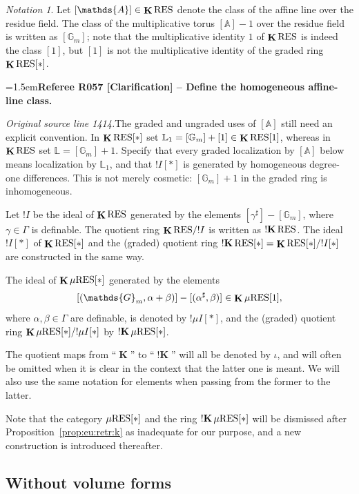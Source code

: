 \documentclass[12pt]{amsart}
\newcommand{\RefereeRemark}[4]{%
  \par\medskip\begingroup\normalfont\small\color{RefereePurple}%
  \emergencystretch=1.5em\noindent\textbf{Referee R#1 [#2] -- #3.}\par\nobreak\noindent #4\par
  \endgroup\medskip
}
\theoremstyle{plain}
\theoremstyle{definition}
\theoremstyle{remark}
\newtheorem{nota}[thm]{Notation}
\numberwithin{equation}{section}
\theoremstyle{plain}
\newcommand{\A}{\mathds{A}}
\newcommand{\G}{\mathds{G}}
\newcommand{\0}{\emptyset}
\newcommand{\RES}{\textup{RES}}
\newcommand{\mgRES}{{\mu}{\RES}}
\DeclareMathOperator{\ggk}{\mathbf{K}}
\DeclareMathOperator{\sggk}{!\mathbf{K}}
\begin{document}
\begin{nota}\label{res:note}
Let $[\A] \in \ggk \RES$ denote the class of the affine line over the residue field. The class of the multiplicative torus $[\A] - 1$ over the residue field is written as $[\G_m]$; note that the multiplicative identity $1$ of $\ggk \RES$ is indeed the class $[1]$, but $[1]$ is not the multiplicative identity of the graded ring $\ggk \RES[*]$.

\RefereeRemark{057}{Clarification}{Define the homogeneous affine-line class}{%
\textit{Original source line 1414.}\quad The graded and ungraded uses of $[\mathbb A]$ still need an explicit convention. In $\ggk\RES[*]$ set $\mathbb L_1=[\mathbb G_m]+[1]\in\ggk\RES[1]$, whereas in $\ggk\RES$ set $\mathbb L=[\mathbb G_m]+1$. Specify that every graded localization by $[\mathbb A]$ below means localization by $\mathbb L_1$, and that $!I[*]$ is generated by homogeneous degree-one differences. This is not merely cosmetic: $[\mathbb G_m]+1$ in the graded ring is inhomogeneous.
}

Let $!I$ be the ideal of $\ggk \RES$ generated by the elements $[\gamma^\sharp] - [\G_m]$, where $\gamma \in \Gamma$ is definable. The quotient ring $\ggk \RES / !I$ is written as $\sggk \RES$. The ideal $!I[*]$ of $\ggk \RES[*]$ and the (graded) quotient ring $\sggk \RES[*] = \ggk \RES[*] / !I[*]$ are constructed in the same way.

The ideal of $\ggk \mgRES[*]$ generated by the  elements
\[
[(\G_m, \alpha + \beta)] - [(\alpha^\sharp, \beta)] \in \ggk \mgRES[1],
\]
where $\alpha, \beta \in \Gamma$ are definable, is denoted by $!\mu I[*]$, and the (graded) quotient ring $\ggk \mgRES[*] / !\mu I[*]$ by $\sggk \mgRES[*]$.
\end{nota}


The quotient maps from ``$\ggk$'' to ``$\sggk$'' will all be denoted by $\iota$, and will often be omitted when it is clear in the context that the latter one is meant. We will also use the same notation for elements when passing from the former to the latter.

Note that the category $\mgRES[*]$ and the ring $\sggk \mgRES[*]$  will be dismissed after Proposition~\ref{prop:eu:retr:k} as inadequate for our purpose, and a new construction is introduced thereafter.

\subsection{Without volume forms}\label{subs:uni:retr:novol}
\end{document}
